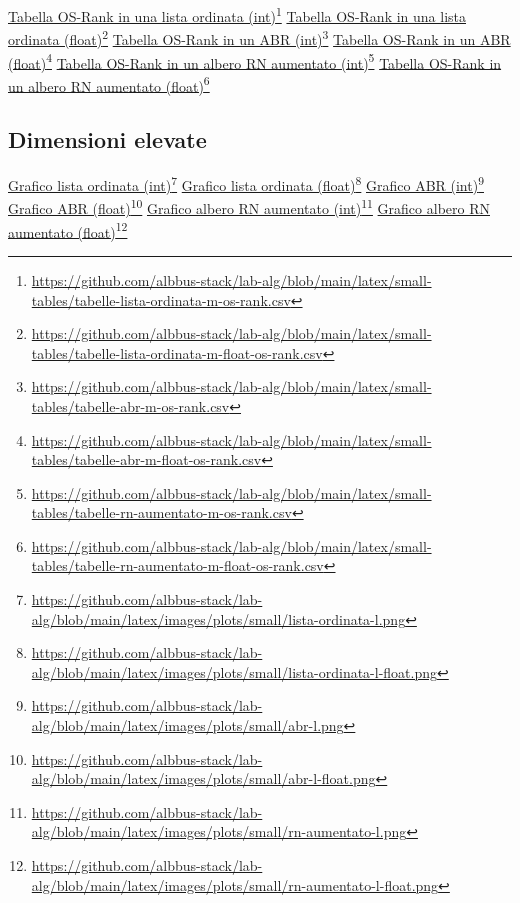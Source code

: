 \documentclass[onecolumn]{article}
\newcommand\anchor[2]{%
  \href{#2}{#1}\footnote{\url{#2}}%
}
\begin{document}
\newpage

\noindent
\anchor{Tabella OS-Rank in una lista ordinata (int)}{https://github.com/albbus-stack/lab-alg/blob/main/latex/small-tables/tabelle-lista-ordinata-m-os-rank.csv} \label{label:lista-ordinata-m-os-rank}
\newline
\anchor{Tabella OS-Rank in una lista ordinata (float)}{https://github.com/albbus-stack/lab-alg/blob/main/latex/small-tables/tabelle-lista-ordinata-m-float-os-rank.csv} \label{label:lista-ordinata-m-float-os-rank}
\newline
\anchor{Tabella OS-Rank in un ABR (int)}{https://github.com/albbus-stack/lab-alg/blob/main/latex/small-tables/tabelle-abr-m-os-rank.csv} \label{label:abr-m-os-rank}
\newline
\anchor{Tabella OS-Rank in un ABR (float)}{https://github.com/albbus-stack/lab-alg/blob/main/latex/small-tables/tabelle-abr-m-float-os-rank.csv} \label{label:abr-m-float-os-rank}
\newline
\anchor{Tabella OS-Rank in un albero RN aumentato (int)}{https://github.com/albbus-stack/lab-alg/blob/main/latex/small-tables/tabelle-rn-aumentato-m-os-rank.csv} \label{label:rn-aumentato-m-os-rank}
\newline
\anchor{Tabella OS-Rank in un albero RN aumentato (float)}{https://github.com/albbus-stack/lab-alg/blob/main/latex/small-tables/tabelle-rn-aumentato-m-float-os-rank.csv} \label{label:rn-aumentato-m-float-os-rank}

\newpage
\subsection{Dimensioni elevate}

\anchor{Grafico lista ordinata (int)}{https://github.com/albbus-stack/lab-alg/blob/main/latex/images/plots/small/lista-ordinata-l.png} \label{label:lista-ordinata-l}
\newline
\anchor{Grafico lista ordinata (float)}{https://github.com/albbus-stack/lab-alg/blob/main/latex/images/plots/small/lista-ordinata-l-float.png} \label{label:lista-ordinata-l-float}
\newline
\anchor{Grafico ABR (int)}{https://github.com/albbus-stack/lab-alg/blob/main/latex/images/plots/small/abr-l.png} \label{label:abr-l}
\newline
\anchor{Grafico ABR (float)}{https://github.com/albbus-stack/lab-alg/blob/main/latex/images/plots/small/abr-l-float.png} \label{label:abr-l-float}
\newline
\anchor{Grafico albero RN aumentato (int)}{https://github.com/albbus-stack/lab-alg/blob/main/latex/images/plots/small/rn-aumentato-l.png} \label{label:rn-aumentato-l}
\newline
\anchor{Grafico albero RN aumentato (float)}{https://github.com/albbus-stack/lab-alg/blob/main/latex/images/plots/small/rn-aumentato-l-float.png} \label{label:rn-aumentato-l-float}
\end{document}
